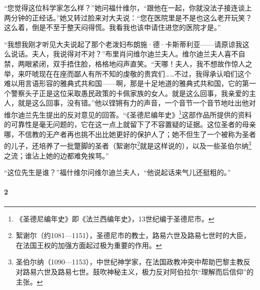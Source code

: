 \par “您觉得这位科学家怎么样？”她问福什维尔，“跟他在一起，你就没法子接连谈上两分钟的正经话。”她又转过脸来对大夫说：“您在医院里是不是也这么老开玩笑？这么着，倒是不至于整天闷得慌。我看我也该申请住进您的医院才是。”
\par “我想我刚才听见大夫说起了那个老泼妇布朗施·德·卡斯蒂利亚——请原谅我这么说话。夫人，我说得对不对？”布里肖问维尔迪兰夫人。维尔迪兰夫人喜不自禁，两眼紧闭，双手捂住脸，格格地闷声直笑。“天哪！夫人，我不想故作惊人之举，来吓唬现在在座而鄙人有所不知的虔敬的贵宾们……不过，我得承认咱们这个难以用言语形容的雅典式共和国——啊，那是十足地道的雅典式共和国，它的第一个警察头子正是这位采取愚民政策的卡佩家族的女人。就是这么回事，我亲爱的主人，就是这么回事，没有错。”他以铿锵有力的声音，一个音节一个音节地吐出他对维尔迪兰先生提出的反对意见的回答。“《圣德尼编年史》\footnote{《圣德尼编年史》即《法兰西编年史》，13世纪编于圣德尼市。}这部作品所提供的资料的可靠性是毫无问题的，它在这一点上就留下了不容置疑的证据。这位圣者的母亲哪，不信教的无产者再也挑不出比她更好的保护人了；她不但生了一个被称为圣者的儿子，还培养了一批蹩脚的圣者（絮谢尔\footnote{絮谢尔（约1081—1151），圣德尼市的教士，路易六世及路易七世时的大臣，在法国王权的加强方面起过极为重要的作用。}就是这样说的），以及一些圣伯尔纳\footnote{圣伯尔纳（1090—1153），中世纪神学家，在法国政教冲突中帮助巴黎主教反对路易六世及路易七世。鼓吹神秘主义，极力反对阿伯拉尔“理解而后信仰”的主张。}之流；谁沾上她的边都难免挨骂。”
\par “这位先生是谁？”福什维尔问维尔迪兰夫人，“他说起话来气儿还挺粗的。”


\paragraph*{2}

